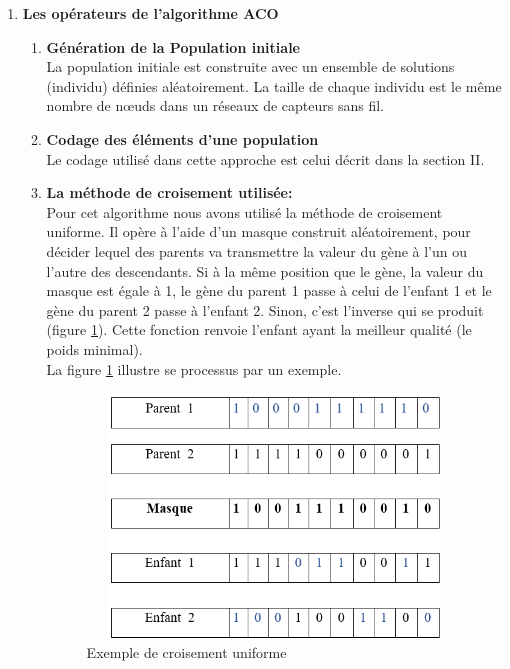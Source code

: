 \begin{enumerate}
	\item \textbf{Les opérateurs de l’algorithme ACO}\\

\begin{enumerate}[label=\alph*)]
	\item \textbf{Génération de la Population initiale}\\
	La population initiale est construite avec un ensemble de solutions (individu) définies aléatoirement. La taille de chaque individu est le même nombre de nœuds dans un réseaux de capteurs sans fil.


	\item \textbf{Codage des éléments d’une population}\\
	Le codage utilisé dans cette approche est celui décrit dans la section II.
	
	\item \textbf{La méthode de croisement utilisée:}\\
	Pour cet algorithme nous avons utilisé la méthode de croisement uniforme. Il opère à l’aide d’un masque construit aléatoirement, pour décider lequel des parents va transmettre  la valeur du gène à l’un ou l’autre des descendants. Si à la même position que le gène, la valeur du masque est égale à 1, le gène du parent 1 passe à celui de l’enfant 1 et le gène du parent 2 passe à l’enfant 2. Sinon, c’est l’inverse qui se produit (figure \ref{fig:ECU}). Cette fonction renvoie l’enfant ayant la meilleur qualité (le poids minimal).\\
La figure \ref{fig:ECU} illustre se processus par un exemple.

\begin{figure}[H]
	\centering
	\includegraphics[width=12cm,height=6.5cm]{Chap4/1.png}
	\caption{Exemple de croisement uniforme}
	\label{fig:ECU}
\end{figure}
	


\end{enumerate}
\end{enumerate}
